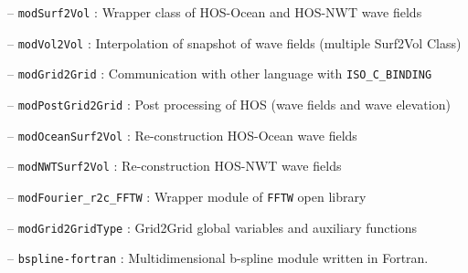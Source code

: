 {
\hspace{0.5 cm} -- \texttt{modSurf2Vol} : Wrapper class of HOS-Ocean and HOS-NWT wave fields

\hspace{0.5 cm} -- \texttt{modVol2Vol} : Interpolation of snapshot of wave fields (multiple Surf2Vol Class)

\hspace{0.5 cm} -- \texttt{modGrid2Grid} : Communication with other language with \texttt{ISO\_C\_BINDING}

\hspace{0.5 cm} -- \texttt{modPostGrid2Grid} : Post processing of HOS (wave fields and wave elevation)

\hspace{0.5 cm} -- \texttt{modOceanSurf2Vol} : Re-construction HOS-Ocean wave fields

\hspace{0.5 cm} -- \texttt{modNWTSurf2Vol} : Re-construction HOS-NWT wave fields

\hspace{0.5 cm} -- \texttt{modFourier\_r2c\_FFTW} : Wrapper module of \texttt{FFTW} open library

\hspace{0.5 cm} -- \texttt{modGrid2GridType} : Grid2Grid global variables and auxiliary functions

\hspace{0.5 cm} -- \texttt{bspline-fortran} : Multidimensional b-spline module written in Fortran.
}